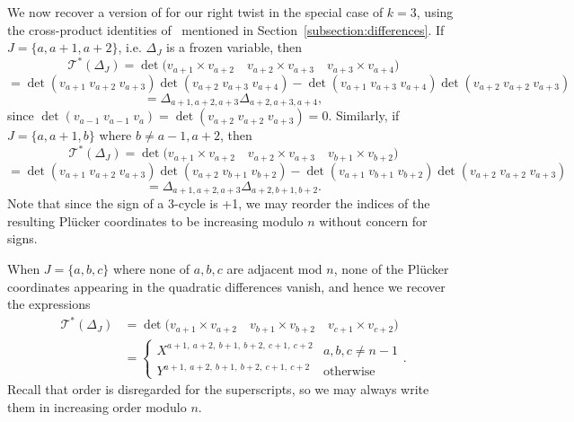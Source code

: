 \documentclass[11pt]{article}
\theoremstyle{definition}
\numberwithin{equation}{section}
\def\T {{\mathscr{T}^*}}
\numberwithin{equation}{section}
\begin{document}
We now recover a version of \cite[Proposition 3.5]{marshscott2016} for our right twist in the special case of $k=3$, using the cross-product identities of~\cite{s06} mentioned in Section~\ref{subsection:differences}. If~$J =\{ a, a+1, a+2\}$, i.e. $\Delta_J$ is a frozen variable, then 
\[\T(\Delta_J) = \det \bigg( v_{a+1} \times v_{a+2} \quad v_{a+2} \times v_{a+3} \quad v_{a+3} \times v_{a+4}\bigg) \]\[= \det(v_{a+1} \hspace{3pt} v_{a+2} \hspace{3pt} v_{a+3}) \det (v_{a+2}\hspace{3pt}  v_{a+3}\hspace{3pt} v_{a+4}) - \det (v_{a+1}\hspace{3pt} v_{a+3}\hspace{3pt} v_{a+4}) \det(v_{a+2}\hspace{3pt} v_{a+2}\hspace{3pt} v_{a+3}) \]\[= \Delta_{a+1,a+2,a+3} \Delta_{a+2,a+3,a+4},\]
since $\det(v_{a-1}\hspace{3pt} v_{a-1}\hspace{3pt} v_{a})=\det(v_{a+2}\hspace{3pt} v_{a+2}\hspace{3pt} v_{a+3}) = 0$.
Similarly, if $J = \{a,a+1, b\}$ where $b \neq a-1, a+2$, then 
\[\T(\Delta_J) = \det \bigg( v_{a+1} \times v_{a+2} \quad v_{a+2} \times v_{a+3} \quad v_{b+1} \times v_{b+2}\bigg) \]\[= \det(v_{a+1}\hspace{3pt} v_{a+2}\hspace{3pt} v_{a+3}) \det(v_{a+2}\hspace{3pt} v_{b+1}\hspace{3pt} v_{b+2}) - \det(v_{a+1}\hspace{3pt} v_{b+1}\hspace{3pt} v_{b+2}) \det(v_{a+2}\hspace{3pt} v_{a+2}\hspace{3pt} v_{a+3}) \]\[= \Delta_{a+1,a+2,a+3} \Delta_{a+2,b+1,b+2}.\]
Note that since the sign of a 3-cycle is +1, we may reorder the indices of the resulting Pl\"ucker coordinates to be increasing modulo $n$ without concern for signs.

When $J = \{a,b,c\}$ where none of $a,b,c$ are adjacent mod $n$, none of the Pl{\"u}cker coordinates appearing in the quadratic differences vanish, and hence we recover the expressions 
\begin{eqnarray*}\T(\Delta_J) &= \det \bigg( v_{a+1} \times v_{a+2} \quad v_{b+1} \times v_{b+2} \quad v_{c+1} \times v_{c+2}\bigg) \\
&=\begin{cases}
X^{a+1,~a+2,~b+1,~b+2,~c+1,~c+2} & a,b,c \neq n-1\\
Y^{a+1,~a+2,~b+1,~b+2,~c+1,~c+2} & \text{otherwise}
\end{cases}.\end{eqnarray*}
Recall that order is disregarded for the superscripts, so we may always write them in increasing order modulo $n$.
\end{document}

